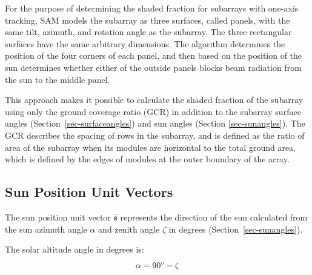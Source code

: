 \documentclass[12pt,letterpaper]{article}
\begin{document}
For the purpose of determining the shaded fraction for subarrays with one-axis tracking, SAM  models the subarray as three surfaces, called panels, with the same tilt, azimuth, and rotation angle as the subarray. The three rectangular surfaces have the same arbitrary dimensions. The algorithm determines the position of the four corners of each panel, and then based on the position of the sun determines whether either of the outside panels blocks beam radiation from the sun to the middle panel.

This approach makes it possible to calculate the shaded fraction of the subarray using only the ground coverage ratio (GCR) in addition to the subarray surface angles (Section~\ref{sec-surfaceangles}) and sun angles (Section \ref{sec-sunangles}). The GCR describes the spacing of rows in the subarray, and is defined as the ratio of area of the subarray when its modules are horizontal to the total ground area, which is defined by the edges of modules at the outer boundary of the array.

\subsection{Sun Position Unit Vectors}

The sun position unit vector $\mathbf{\hat s}$ represents the direction of the sun calculated from the sun azimuth angle $\alpha$ and zenith angle $\zeta$ in degrees (Section~\ref{sec-sunangles}).

The solar altitude angle in degrees is:
\begin{equation}
\alpha = 90\degree - \zeta
\end{equation}
\end{document}
